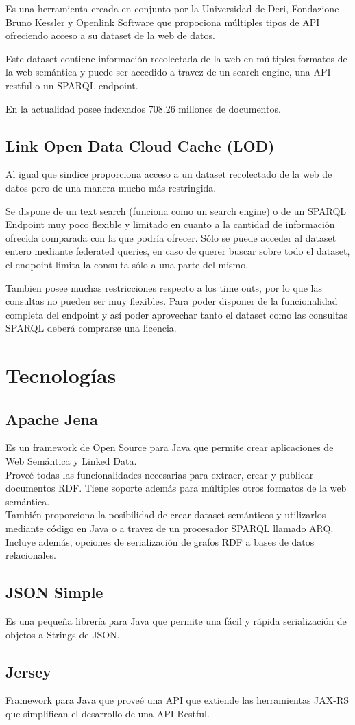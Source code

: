 \cite{Oren2008} Es una herramienta creada en conjunto por la Universidad de Deri,  Fondazione Bruno Kessler y Openlink Software que propociona 
múltiples tipos de API ofreciendo acceso a su dataset de la web de datos. 

Este dataset contiene información recolectada de la web en múltiples formatos de la web semántica y puede ser accedido a travez 
de un search engine, una API restful o un SPARQL endpoint. 

En la actualidad posee indexados 708.26 millones de documentos.

\subsection{Link Open Data Cloud Cache (LOD)} 

Al igual que sindice proporciona acceso a un dataset recolectado de la web de datos pero de una manera mucho más restringida. 

Se dispone de un text search (funciona como un search engine) o de un SPARQL Endpoint muy poco flexible y limitado en cuanto a 
la cantidad de información ofrecida comparada con la que podría ofrecer. Sólo se puede acceder al dataset entero mediante federated
queries, en caso de querer buscar sobre todo el dataset, el endpoint limita la consulta sólo a una parte del mismo. 

Tambien posee muchas restricciones respecto a los time outs, por lo que las consultas no pueden ser muy flexibles.
Para poder disponer de la funcionalidad completa del endpoint y así poder aprovechar tanto el dataset como las consultas SPARQL 
deberá comprarse una licencia.


\section{Tecnologías}

\subsection{Apache Jena}

Es un framework de Open Source para Java que permite crear aplicaciones de Web Semántica y Linked Data. \\
Proveé todas las funcionalidades necesarias para extraer, crear y publicar documentos RDF. Tiene soporte además para múltiples otros 
formatos de la web semántica. \\
También proporciona la posibilidad de crear dataset semánticos y utilizarlos mediante código en Java o a travez de un procesador SPARQL 
llamado ARQ.\\
Incluye además, opciones de serialización de grafos RDF a bases de datos relacionales.

\subsection{JSON Simple}

Es una pequeña librería para Java que permite una fácil y rápida serialización de objetos a 
Strings de JSON.

\subsection{Jersey}

Framework para Java que proveé una API que extiende las herramientas JAX-RS que simplifican el 
desarrollo de una API Restful. 
